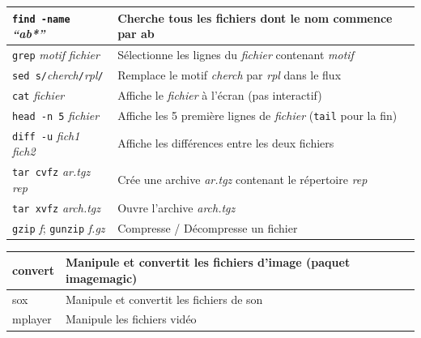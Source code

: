 \documentclass[a4paper,10pt,landscape,twocolumn]{article}
\newcommand{\Subsection}[1]{{\textbf{#1}}}
\begin{document}
\begin{tabular}{|p{3cm}|p{10cm}|}\hline
\texttt{find -name} \textit{``ab*''} & Cherche tous les fichiers dont le nom commence par ab \\\hline

\texttt{grep} \textit{motif} \textit{fichier}& Sélectionne les lignes du \textit{fichier}
contenant \textit{motif}\\\hline

  \texttt{sed s/}\textit{cherch}\texttt{/}\textit{rpl}\texttt{/}&
  Remplace le motif \textit{cherch} par \textit{rpl} dans le flux\\\hline 
\texttt{cat} \textit{fichier}& Affiche le \textit{fichier} à l'écran (pas interactif)\\ \hline

  \texttt{head -n 5} \textit{fichier}&
   Affiche les 5 première lignes de \textit{fichier} (\texttt{tail} pour la fin) \\\hline

\texttt{diff -u} \textit{fich1} \textit{fich2}& Affiche les différences entre les deux fichiers\\\hline

{\small \texttt{tar cvfz} \textit{ar.tgz} \textit{rep}} & Crée une archive \textit{ar.tgz}
contenant le répertoire \textit{rep}\\
\texttt{tar xvfz} \textit{arch.tgz} & Ouvre l'archive \textit{arch.tgz}\\\hline

\texttt{gzip} \textit{f}; \texttt{gunzip} \textit{f.gz} & Compresse / Décompresse un fichier\\\hline
\end{tabular}

\medskip\Subsection{Convertions}\smallskip

\begin{tabular}{|p{30mm}|p{100mm}|}\hline
convert & Manipule et convertit les fichiers d'image (paquet imagemagic)\\\hline
sox & Manipule et convertit les fichiers de son\\\hline
mplayer & Manipule les fichiers vidéo\\\hline
\end{tabular}
\end{document}
